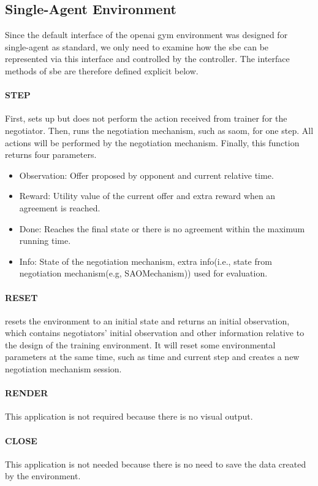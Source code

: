 \subsection{Single-Agent Environment} \label{single-agent-env}
Since the default interface of the \gls{openai gym} environment was designed for single-agent as standard, we only need to examine how the \gls{sbe} can be represented via this interface and controlled by the controller. The interface methods of \gls{sbe} are therefore defined explicit below. 

\paragraph{STEP} First, sets up but does not perform the action received from trainer for the negotiator. Then, runs the negotiation mechanism, such as \gls{saom}, for one step. All actions will be performed by the negotiation mechanism. Finally, this function returns four parameters.

\begin{itemize}
	\item Observation: Offer proposed by opponent and current relative time.
	\item Reward: Utility value of the current offer and extra reward when an agreement is reached.
	\item Done: Reaches the final state or there is no agreement within the maximum running time.
	\item Info: State of the negotiation mechanism, extra info(i.e., state from negotiation mechanism(e.g, SAOMechanism)) used for evaluation.
\end{itemize}

\paragraph{RESET} resets the environment to an initial state and returns an initial observation, which contains negotiators' initial observation and other information relative to the design of the training environment. It will reset some environmental parameters at the same time, such as time and current step and creates a new negotiation mechanism session.
\paragraph{RENDER} This application is not required because there is no visual output.
\paragraph{CLOSE}  This application is not needed because there is no need to save the data created by the environment.
